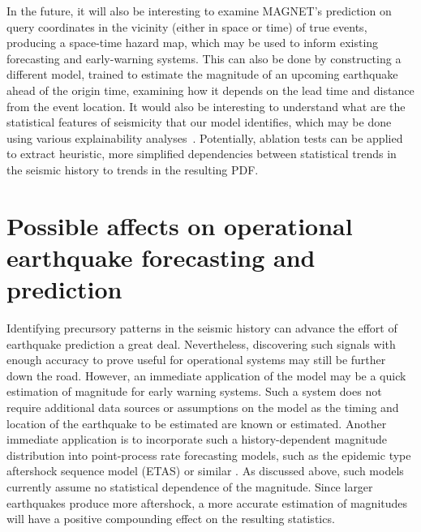 \documentclass[pdflatex]{sn-jnl}
\newcommand{\neri}[1]{{\textcolor{cyan}{#1}}}
\begin{document}
In the future, it will also be interesting to examine MAGNET's prediction on query coordinates in the vicinity (either in space or time) of true events, producing a space-time hazard map, which may be used to inform existing forecasting and early-warning systems. This can also be done by constructing a different model, trained to estimate the magnitude of an upcoming earthquake ahead of the origin time, examining how it depends on the lead time and distance from the event location. 
It would also be interesting to understand what are the statistical features of seismicity that our model identifies, which may be done using various explainability analyses~\cite{sturmfels_visualizing_2020, zhang_survey_2021, liu_interpretable_2023}. Potentially, ablation tests \cite{meyes_ablation_2019, sturmfels_visualizing_2020} can be applied to extract heuristic, more simplified dependencies between statistical trends in the seismic history to trends in the resulting PDF.


\section{Possible affects on operational earthquake forecasting and prediction}
Identifying precursory patterns in the seismic history can advance the effort of earthquake prediction a great deal\cite{mousavi_deep-learning_2022, mousavi_machine_2023, mignan_neural_2020, karimpouli_explainable_2023, bergen_machine_2019}. Nevertheless, discovering such signals with enough accuracy to prove useful for operational systems may still be further down the road.
However, an immediate application of the model may be a quick estimation of magnitude for early warning systems. Such a system does not require additional data sources or assumptions on the model as the timing and location of the earthquake to be estimated are known or estimated. 
Another immediate application is to incorporate such a history-dependent magnitude distribution into point-process rate forecasting models, such as the epidemic type aftershock sequence model (ETAS) or similar \cite{ogata_statistical_1988, ogata_statistics_2017, dascher-cousineau_using_2023}. As discussed above, such models currently assume no statistical dependence of the magnitude. Since larger earthquakes produce more aftershock, a more accurate estimation of magnitudes will have a positive compounding effect on the resulting statistics.

\end{document}
